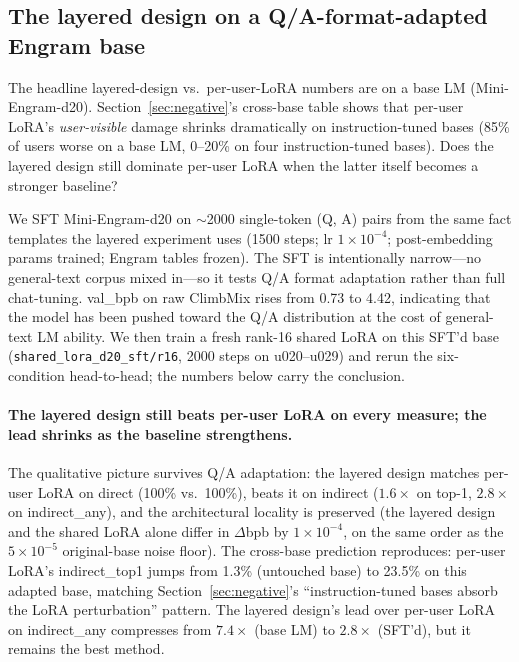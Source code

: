\documentclass[11pt]{article}
\begin{document}
\subsection{The layered design on a Q/A-format-adapted Engram base}
\label{sec:layered-sft}

The headline layered-design vs.\ per-user-LoRA numbers are on a base
LM (Mini-Engram-d20). Section~\ref{sec:negative}'s cross-base
table shows that per-user LoRA's \emph{user-visible} damage
shrinks dramatically on instruction-tuned bases (85\% of users
worse on a base LM, 0--20\% on four instruction-tuned bases).
Does the layered design still dominate per-user LoRA when the latter
itself becomes a stronger baseline?

We SFT Mini-Engram-d20 on $\sim$2000 single-token (Q, A) pairs
from the same fact templates the layered experiment uses (1500
steps; lr $1{\times}10^{-4}$; post-embedding params trained;
Engram tables frozen). The SFT is intentionally narrow---no
general-text corpus mixed in---so it tests Q/A format
adaptation rather than full chat-tuning. val\_bpb on raw
ClimbMix rises from 0.73 to 4.42, indicating that the model
has been pushed toward the Q/A distribution at the cost of
general-text LM ability. We then train a fresh rank-16 shared
LoRA on this SFT'd base
(\texttt{shared\_lora\_d20\_sft/r16}, 2000 steps on
u020--u029) and rerun the six-condition head-to-head; the
numbers below carry the conclusion.

\paragraph{The layered design still beats per-user LoRA on every
measure; the lead shrinks as the baseline
strengthens.} The qualitative picture survives Q/A adaptation:
the layered design matches per-user LoRA on direct (100\% vs.\ 100\%),
beats it on indirect
($1.6\times$ on top-1, $2.8\times$ on indirect\_any), and the
architectural locality is preserved (the layered design and the
shared LoRA alone differ in $\Delta$bpb by $1 \times 10^{-4}$, on
the same order as the $5 \times 10^{-5}$ original-base noise
floor). The cross-base prediction reproduces: per-user LoRA's
indirect\_top1 jumps from 1.3\% (untouched base) to 23.5\% on this
adapted base, matching Section~\ref{sec:negative}'s
``instruction-tuned bases absorb the LoRA perturbation''
pattern. The layered design's lead over per-user LoRA on
indirect\_any compresses from
$7.4\times$ (base LM) to $2.8\times$ (SFT'd), but it remains
the best method.
\end{document}
